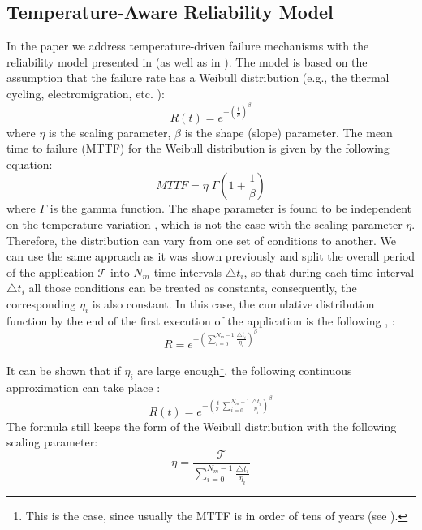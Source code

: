 \subsection{Temperature-Aware Reliability Model}
In the paper we address temperature-driven failure mechanisms with the reliability model presented in \cite{huang2009} (as well as in \cite{xiang2010}). The model is based on the assumption that the failure rate has a Weibull distribution (e.g., the thermal cycling, electromigration, etc. \cite{jedec2010}):
\[
  R(t) = e^{-(\frac{t}{\eta})^\beta}
\]
where $\eta$ is the scaling parameter, $\beta$ is the shape (slope) parameter. The mean time to failure (MTTF) for the Weibull distribution is given by the following equation:
\begin{equation} \label{eq:general-mttf}
  MTTF = \eta \; \Gamma(1 + \frac{1}{\beta})
\end{equation}
where $\Gamma$ is the gamma function. The shape parameter is found to be independent on the temperature variation \cite{chang2006}, which is not the case with the scaling parameter $\eta$. Therefore, the distribution can vary from one set of conditions to another. We can use the same approach as it was shown previously and split the overall period of the application $\mathcal{T}$ into $N_m$ time intervals $\triangle t_i$, so that during each time interval $\triangle t_i$ all those conditions can be treated as constants, consequently, the corresponding $\eta_i$ is also constant. In this case, the cumulative distribution function by the end of the first execution of the application is the following \cite{huang2009}, \cite{xiang2010}:
\[
  R = e^{-(\sum_{i=0}^{N_m - 1} \frac{\triangle t_i}{\eta_i})^\beta}
\]

It can be shown that if $\eta_i$ are large enough\footnote{This is the case, since usually the MTTF is in order of tens of years (see ).}, the following continuous approximation can take place \cite{xiang2010}:
\[
  R(t) = e^{-(\frac{t}{\mathcal{T}} \sum_{i=0}^{N_m - 1} \frac{\triangle t_i}{\eta_i})^\beta}
\]
The formula still keeps the form of the Weibull distribution with the following scaling parameter:
\[
  \eta = \frac{\mathcal{T}}{\sum_{i=0}^{N_m - 1} \frac{\triangle t_i}{\eta_i}}
\]


